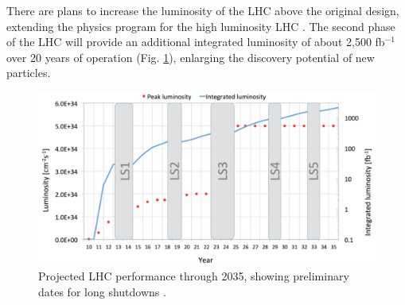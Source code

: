 There are plans to increase the luminosity of the LHC above the original design, extending the physics program for the high luminosity LHC \cite{Contardo:2020886}. The second phase of the LHC will provide an additional integrated luminosity of about 2,500 fb$^{-1}$ over 20 years of operation (Fig. \ref{hllhc}), enlarging the discovery potential of new particles.

\begin{figure}[ht]
\centering
\includegraphics[scale=0.40]{figures/experiment/hllhc.png} 
\caption[Luminosity plans of the HL-LHC]{Projected LHC performance through 2035, showing preliminary dates for long shutdowns \cite{Contardo:2020886}.}
\label{hllhc}
\end{figure}

